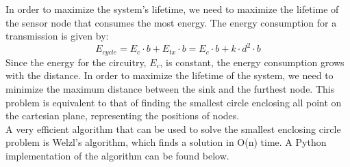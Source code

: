 In order to maximize the system's lifetime, we need to maximize the lifetime of the sensor node that consumes the most energy. The energy consumption for a transmission is given by:
\[
E_{cycle} = E_c \cdot b + E_{tx} \cdot b = E_c \cdot b + k \cdot d^2 \cdot b
\]
Since the energy for the circuitry, $E_c$, is constant, the energy consumption grows with the distance. In order to maximize the lifetime of the system, we need to minimize the maximum distance between the sink and the furthest node. This problem is equivalent to that of finding the smallest circle enclosing all point on the cartesian plane, representing the positions of nodes.\\
A very efficient algorithm that can be used to solve the smallest enclosing circle problem is Welzl's algorithm, which finds a solution in O(n) time. A Python implementation of the algorithm can be found below.

